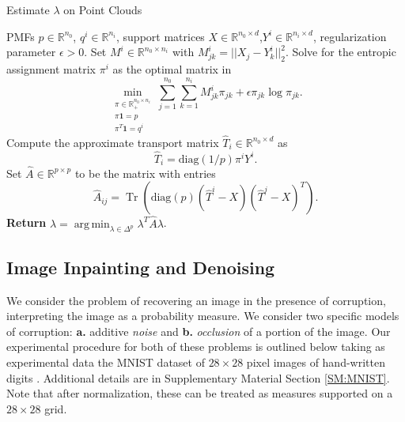 \documentclass[nohyperref]{article}
\DeclareMathOperator*{\argmin}{arg\,min}
\DeclareMathOperator{\Tr}{Tr}
\theoremstyle{definition}
\begin{document}
\begin{algorithm} 
\caption{Estimate $\lambda$ on Point Clouds} \label{alg:estimate_lambda_pc}
\begin{algorithmic}
 PMFs $p \in \mathbb{R}^{n_0}$, $q^i \in \mathbb{R}^{n_i}$, support matrices $X \in \mathbb{R}^{n_0 \times d}$,$Y^i \in \mathbb{R}^{n_i \times d}$, regularization parameter $\epsilon > 0$. 
    \STATE Set $M^i \in \mathbb{R}^{n_0 \times n_i}$ with $M^i_{jk} = ||X_j - Y_k^i||_2^2$.
    \STATE Solve for the entropic assignment matrix $\pi^i$ as the optimal matrix in
    \begin{equation*}
        \min_{\substack{\pi \in \mathbb{R}^{n_0 \times n_i}_+ \\
        \pi\bm{1} = p \\
        \pi^T\bm{1} = q^i}} \sum_{j=1}^{n_0}\sum_{k=1}^{n_i} M^i_{jk}\pi_{jk} + \epsilon \pi_{jk}\log \pi_{jk}.
    \end{equation*}
    \STATE Compute the approximate transport matrix $\hat{T}_i \in \mathbb{R}^{n_0 \times d}$ as
    \begin{equation*}
        \hat{T}_i = \text{diag}(1/p)\pi^i Y^i. 
    \end{equation*}
\ENDFOR
\STATE Set $\hat{A} \in \mathbb{R}^{p \times p}$ to be the matrix with entries
\begin{equation*}
    \hat{A}_{ij} = \Tr\left(\text{diag}(p)(\hat{T}^i-X)(\hat{T}^j-X)^T \right).
\end{equation*}
\STATE \textbf{Return} $\hat{\lambda}=\displaystyle\argmin_{\lambda \in \Delta^p} \lambda^T\hat{A}\lambda$.
\end{algorithmic}
\end{algorithm}




\subsection{Image Inpainting and Denoising} 

We consider the problem of recovering an image in the presence of corruption, interpreting the image as a probability measure.  We consider two specific models of corruption: \textbf{a.} additive \emph{noise} and \textbf{b.} \emph{occlusion} of a portion of the image.  Our experimental procedure for both of these problems is outlined below taking as experimental data the MNIST dataset of $28\times28$ pixel images of hand-written digits \citep{lecun1998mnist}. Additional details are in Supplementary Material Section \ref{SM:MNIST}.  Note that after normalization, these can be treated as measures supported on a $28\times28$ grid.
 
\end{document}
